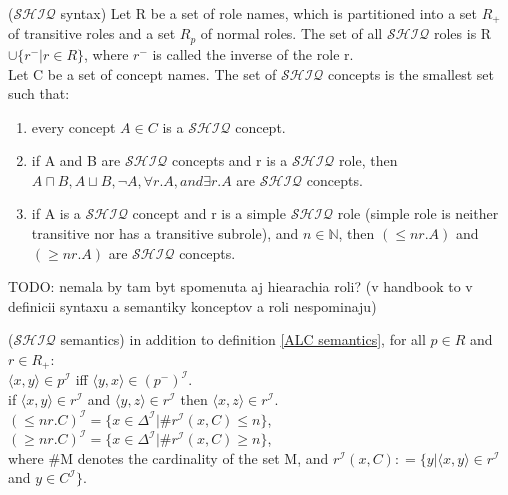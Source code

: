 \begin{mydef} 
\cite{handbook} ($\mathcal{SHIQ}$ syntax) Let R be a set of role names, which is partitioned into a set $R_+$ of transitive roles and a set $R_p$ of normal roles. 
The set of all $\mathcal{SHIQ}$ roles is R $\cup \{r^- | r \in R\}$, where $r^-$ is called the inverse of the role r. \\
Let C be a set of concept names. The set of $\mathcal{SHIQ}$ concepts is the smallest set such that:  
\begin{enumerate}
\item every concept $A \in C$ is a $\mathcal{SHIQ}$ concept.
\item if A and B are $\mathcal{SHIQ}$ concepts and r is a $\mathcal{SHIQ}$ role, then $A\sqcap B, A\sqcup B,  \neg A, \forall r.A,  and \exists r.A$ are $\mathcal{SHIQ}$ concepts.
\item if A is a $\mathcal{SHIQ}$ concept and r is a simple $\mathcal{SHIQ}$ role (simple role is neither transitive nor has a transitive subrole), and $n \in \mathbb{N}$, then $(\leq n r.A)$  and 
$(\geq n r.A)$ are $\mathcal{SHIQ}$ concepts.
\end{enumerate}
TODO: nemala by tam byt spomenuta aj hiearachia roli? (v handbook to v definicii syntaxu a semantiky konceptov a roli nespominaju) \\
\end{mydef}
 \begin{mydef}($\mathcal{SHIQ}$ semantics) \cite{handbook}
in addition to definition \ref{ALC semantics}, for all  $p \in R$ and $r \in R_+$: \\
 $\langle x,y \rangle \in p^\mathcal{I}$ iff  $\langle y,x \rangle \in (p^- )^\mathcal{I}$. \\
 if $\langle x,y \rangle \in r^\mathcal{I}$ and $ \langle y,z \rangle \in r^\mathcal{I}$ then $\langle x,z \rangle \in r^\mathcal{I}$.\\
 $(\leq n r.C)^\mathcal{I} = \{x \in \Delta ^\mathcal{I} | \# r^\mathcal{I} (x,C) \leq n\}$,\\
$(\geq n r.C)^\mathcal{I} = \{x \in \Delta ^\mathcal{I} | \# r^\mathcal{I} (x,C) \geq n\}$,\\

where \#M  denotes the cardinality of the set M, and $r^\mathcal{I} (x,C) \mathrel{\mathop:}= \{y | \langle x,y \rangle \in r^\mathcal{I}$ and $y \in C^\mathcal{I}\}$.
\end{mydef}


